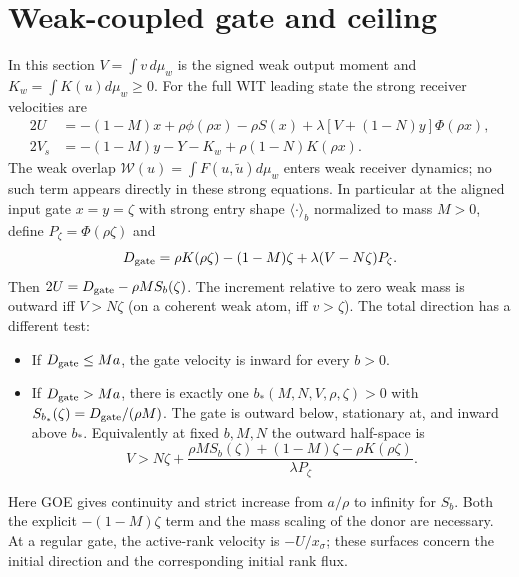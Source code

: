 \documentclass[11pt]{article}
\begin{document}
\section{Weak-coupled gate and ceiling}\label{an04impv1:weak}
In this section \(V=\int v\,d\mu_w\) is the signed weak output
moment and \(K_w=\int K(u)d\mu_w\ge0\). For the full WIT leading
state the strong receiver velocities are
\begin{align*}
 2U&=-(1-M)x+\rho\phi(\rho x)-\rho S(x)
                  +\lambda[V+(1-N)y]\Phi(\rho x),\\
 2V_s&=-(1-M)y-Y-K_w+\rho(1-N)K(\rho x).
\end{align*}
The weak overlap \(\mathcal W(u)=\int F(u,\tilde u)d\mu_w\)
enters weak receiver dynamics; no such term appears directly in
these strong equations. In particular at the aligned input gate
\(x=y=\zeta\) with strong entry shape \(\langle\cdot\rangle_b\)
normalized to mass \(M>0\), define \(P_\zeta=\Phi(\rho\zeta)\) and
\[
 D_{\rm gate}=\rho K(\rho\zeta)-(1-M)\zeta+
                    \lambda(V-N\zeta)P_\zeta .
\]
Then \(2U=D_{\rm gate}-\rho M S_b(\zeta)\). The increment relative
to zero weak mass is outward iff \(V>N\zeta\) (on a coherent weak
atom, iff \(v>\zeta\)). The total direction has a different test:
\begin{itemize}
\item If \(D_{\rm gate}\le Ma\), the gate velocity is inward for
every \(b>0\).
\item If \(D_{\rm gate}>Ma\), there is exactly one
\(b_*(M,N,V,\rho,\zeta)>0\) with
\(S_{b_*}(\zeta)=D_{\rm gate}/(\rho M)\).
The gate is outward below, stationary at, and inward above \(b_*\).
Equivalently at fixed \(b,M,N\) the outward half-space is
\[
 V>N\zeta+\frac{\rho M S_b(\zeta)+(1-M)\zeta-
                         \rho K(\rho\zeta)}{\lambda P_\zeta}.
\]
\end{itemize}
Here GOE gives continuity and strict increase from \(a/\rho\) to
infinity for \(S_b\). Both the explicit \(-(1-M)\zeta\) term and
the mass scaling of the donor are necessary. At a regular gate,
the active-rank velocity is \(-U/x_\sigma\); these surfaces concern
the initial direction and the corresponding initial rank flux.
\end{document}
